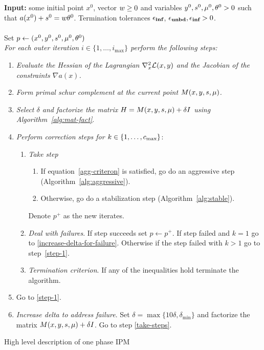 \documentclass{article}
\begin{document}
\begin{algorithm}[H]
\textbf{Input:} some initial point $x^{0}$, vector $w \ge 0$ and variables $y^{0}, s^{0}, \mu^0, \theta^{0} > 0$  such that $a(x^{0}) + s^{0} = w \theta^{0}$. Termination tolerances $\epsilon_{\textbf{inf}}$, $\epsilon_{\textbf{unbd}}, \epsilon_{\textbf{inf}} > 0$. \\
\vspace{0.2 cm} \\
Set $p \gets (x^{0}, y^{0}, s^{0}, \mu^{0}, \theta^{0})$ 
\vspace{0.2 cm} \\
\emph{For each outer iteration $i \in \{1, \dots, i_{\max}\}$ perform the following steps:}
\begin{enumerate}[label*=A.{\arabic*}]
\item \label{step-1}  \emph{Evaluate the Hessian of the Lagrangian $\nabla^2_{x} \mathcal{L}(x,y)$ and the Jacobian of the constraints $\nabla a(x)$.}
\item \emph{Form primal schur complement at the current point $M(x,y,s,\mu)$.}
\item \emph{Select $\delta$ and factorize the matrix $H = M(x,y,s,\mu) + \delta I$ using Algorithm~\ref{alg:mat-fact}}.
\item \label{take-steps}  \emph{Perform correction steps for $k \in \{ 1, \dots , c_{\max} \}$}:
\begin{enumerate}[label*=.{\arabic*}]
\item \emph{Take step}\label{line:take-step}
\begin{enumerate}[label=-Case-{\Roman*}]
\item If equation~\eqref{agg-criteron} is satisfied, go do an aggressive step (Algorithm~\ref{alg:aggressive}).
\item Otherwise, go do a stabilization step (Algorithm~\ref{alg:stable}).
\end{enumerate}
Denote $p^{+}$ as the new iterates.
\item \emph{Deal with failures}. If step succeeds set $p \gets p^{+}$. If step failed and $k = 1$ go to \eqref{increase-delta-for-failure}. Otherwise if the step failed with $k > 1$ go to step~\eqref{step-1}.
\item \emph{Termination criterion}. If any of the inequalities \termination{} hold terminate the algorithm.
\end{enumerate}
\item Go to \eqref{step-1}.
\item \label{increase-delta-for-failure} \emph{Increase delta to address failure}. Set $\delta = \max\{10 \delta, \delta_{\min} \}$ and factorize the matrix $M(x,y,s,\mu) + \delta I$. Go to step \eqref{take-steps}.
\end{enumerate}
\caption{High level description of one phase IPM}\label{one-phase-IPM}
\end{algorithm}
\end{document}
